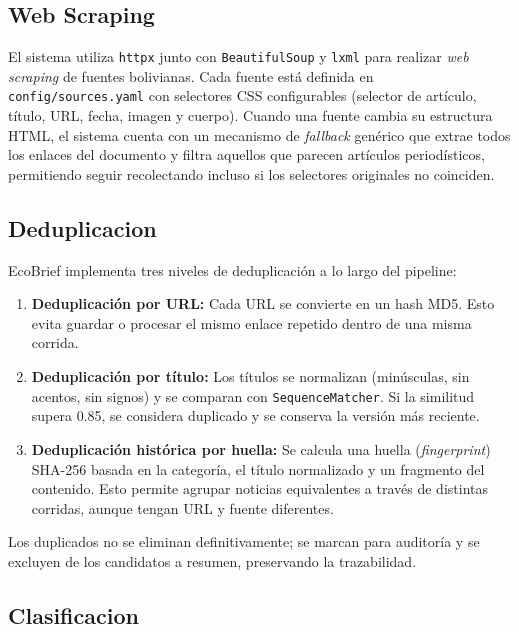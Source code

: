 \documentclass[12pt,oneside]{report}
\begin{document}
\subsection{Web Scraping}

El sistema utiliza \texttt{httpx} junto con \texttt{BeautifulSoup} y \texttt{lxml} para realizar \textit{web scraping} de fuentes bolivianas. Cada fuente est\'a definida en \texttt{config/sources.yaml} con selectores CSS configurables (selector de art\'iculo, t\'itulo, URL, fecha, imagen y cuerpo). Cuando una fuente cambia su estructura HTML, el sistema cuenta con un mecanismo de \textit{fallback} gen\'erico que extrae todos los enlaces del documento y filtra aquellos que parecen art\'iculos period\'isticos, permitiendo seguir recolectando incluso si los selectores originales no coinciden.

\subsection{Deduplicacion}

EcoBrief implementa tres niveles de deduplicaci\'on a lo largo del pipeline:

\begin{enumerate}[nosep]
    \item \textbf{Deduplicaci\'on por URL:} Cada URL se convierte en un hash MD5. Esto evita guardar o procesar el mismo enlace repetido dentro de una misma corrida.
    \item \textbf{Deduplicaci\'on por t\'itulo:} Los t\'itulos se normalizan (min\'usculas, sin acentos, sin signos) y se comparan con \texttt{SequenceMatcher}. Si la similitud supera 0.85, se considera duplicado y se conserva la versi\'on m\'as reciente.
    \item \textbf{Deduplicaci\'on hist\'orica por huella:} Se calcula una huella (\textit{fingerprint}) SHA-256 basada en la categor\'ia, el t\'itulo normalizado y un fragmento del contenido. Esto permite agrupar noticias equivalentes a trav\'es de distintas corridas, aunque tengan URL y fuente diferentes.
\end{enumerate}

Los duplicados no se eliminan definitivamente; se marcan para auditor\'ia y se excluyen de los candidatos a resumen, preservando la trazabilidad.

\subsection{Clasificacion}
\end{document}
